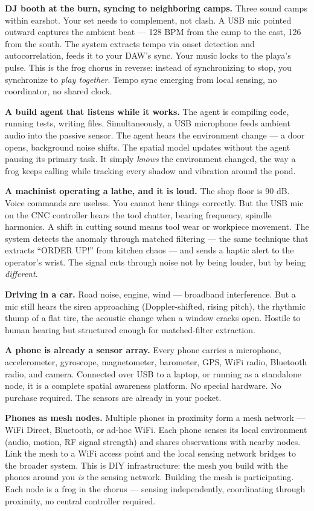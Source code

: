\documentclass[11pt,letterpaper]{article}
\begin{document}
\textbf{DJ booth at the burn, syncing to neighboring camps.} Three sound camps within earshot. Your set needs to complement, not clash. A USB mic pointed outward captures the ambient beat --- 128 BPM from the camp to the east, 126 from the south. The system extracts tempo via onset detection and autocorrelation, feeds it to your DAW's sync. Your music locks to the playa's pulse. This is the frog chorus in reverse: instead of synchronizing to stop, you synchronize to \textit{play together}. Tempo sync emerging from local sensing, no coordinator, no shared clock.

\textbf{A build agent that listens while it works.} The agent is compiling code, running tests, writing files. Simultaneously, a USB microphone feeds ambient audio into the passive sensor. The agent hears the environment change --- a door opens, background noise shifts. The spatial model updates without the agent pausing its primary task. It simply \textit{knows} the environment changed, the way a frog keeps calling while tracking every shadow and vibration around the pond.

\textbf{A machinist operating a lathe, and it is loud.} The shop floor is 90 dB. Voice commands are useless. You cannot hear things correctly. But the USB mic on the CNC controller hears the tool chatter, bearing frequency, spindle harmonics. A shift in cutting sound means tool wear or workpiece movement. The system detects the anomaly through matched filtering --- the same technique that extracts ``ORDER UP!'' from kitchen chaos --- and sends a haptic alert to the operator's wrist. The signal cuts through noise not by being louder, but by being \textit{different}.

\textbf{Driving in a car.} Road noise, engine, wind --- broadband interference. But a mic still hears the siren approaching (Doppler-shifted, rising pitch), the rhythmic thump of a flat tire, the acoustic change when a window cracks open. Hostile to human hearing but structured enough for matched-filter extraction.

\textbf{A phone is already a sensor array.} Every phone carries a microphone, accelerometer, gyroscope, magnetometer, barometer, GPS, WiFi radio, Bluetooth radio, and camera. Connected over USB to a laptop, or running as a standalone node, it is a complete spatial awareness platform. No special hardware. No purchase required. The sensors are already in your pocket.

\textbf{Phones as mesh nodes.} Multiple phones in proximity form a mesh network --- WiFi Direct, Bluetooth, or ad-hoc WiFi. Each phone senses its local environment (audio, motion, RF signal strength) and shares observations with nearby nodes. Link the mesh to a WiFi access point and the local sensing network bridges to the broader system. This is DIY infrastructure: the mesh you build with the phones around you \textit{is} the sensing network. Building the mesh is participating. Each node is a frog in the chorus --- sensing independently, coordinating through proximity, no central controller required.
\end{document}
